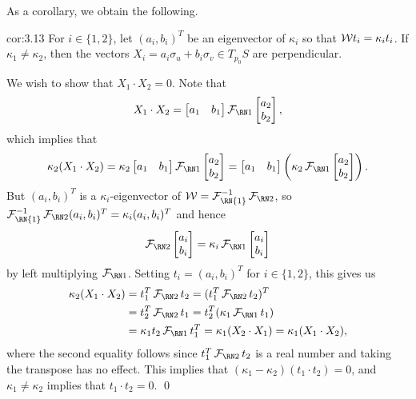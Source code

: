 As a corollary, we obtain the following. 

\begin{cor}{cor:3.13}
    For $i \in \{1, 2\}$, let $(a_i, b_i)^T$ be an eigenvector of 
    $\kappa_i$ so that ${\cal W}t_i = \kappa_i t_i$. If $\kappa_1 \neq \kappa_2$, 
    then the vectors $X_i = a_i \sigma_u + b_i \sigma_v \in T_{p_0}S$ 
    are perpendicular. 
\end{cor}\vspace{-0.25cm}
\begin{pf}
    We wish to show that $X_1 \cdot X_2 = 0$. Note that 
    \[ X_1 \cdot X_2 = \begin{bmatrix}
        a_1 & b_1 
    \end{bmatrix} \FFF \begin{bmatrix}
        a_2 \\ b_2 
    \end{bmatrix}, \] 
    which implies that 
    \[ \kappa_2(X_1 \cdot X_2) = \kappa_2 \begin{bmatrix}
        a_1 & b_1 
    \end{bmatrix} \FFF \begin{bmatrix}
        a_2 \\ b_2 
    \end{bmatrix} = \begin{bmatrix}
        a_1 & b_1 
    \end{bmatrix} \left( \kappa_2 \FFF \begin{bmatrix}
        a_2 \\ b_2 
    \end{bmatrix} \right). \] 
    But $(a_i, b_i)^T$ is a $\kappa_i$-eigenvector of ${\cal W} = 
    {\cal F}_{\text{\RN{1}}}^{-1} \SFF$, so 
    ${\cal F}_{\text{\RN{1}}}^{-1} \SFF (a_i, b_i)^T 
    = \kappa_i (a_i, b_i)^T$ and hence 
    \[ \SFF \begin{bmatrix}
        a_i \\ b_i 
    \end{bmatrix} = \kappa_i \FFF \begin{bmatrix}
        a_i \\ b_i 
    \end{bmatrix} \] 
    by left multiplying $\FFF$. Setting $t_i = (a_i, b_i)^T$ 
    for $i \in \{1, 2\}$, this gives us
    \begin{align*}
        \kappa_2(X_1 \cdot X_2) 
        &= t_1^T \SFF t_2  
        = (t_1^T \SFF t_2)^T \\
        &= t_2^T \SFF t_1 
        = t_2^T (\kappa_1 \FFF t_1) \\ 
        &= \kappa_1 t_2 \FFF t_1^T 
        = \kappa_1 (X_2 \cdot X_1) 
        = \kappa_1 (X_1 \cdot X_2),
    \end{align*}
    where the second equality follows since $t_1^T \SFF t_2$ is 
    a real number and taking the transpose has no effect. 
    This implies that $(\kappa_1 - \kappa_2)(t_1 \cdot t_2) = 0$, and 
    $\kappa_1 \neq \kappa_2$ implies that $t_1 \cdot t_2 = 0$. \qed 
\end{pf}\vspace{-0.25cm}

